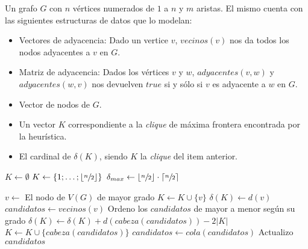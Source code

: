 \begin{pseudocodigo}
    \Require Un grafo $G$ con $n$ v\'ertices numerados de $1$ a $n$ y $m$ aristas. El mismo
        cuenta con las siguientes estructuras de datos que lo modelan:
        \begin{itemize}
            \item Vectores de adyacencia: Dado un vertice $v$, $vecinos(v)$ nos da todos los
                nodos adyacentes a $v$ en $G$.

            \item Matriz de adyacencia: Dados los v\'ertices $v$ y $w$, $adyacentes(v,w)$ y
                $adyacentes(w,v)$ nos devuelven $true$ si y s\'olo si $v$ es adyacente
                a $w$ en $G$.

            \item Vector de nodos de $G$.
        \end{itemize}
    \Ensure\Statex
        \begin{itemize}
            \item Un vector $K$ correspondiente a la \emph{clique} de m\'axima frontera
                encontrada por la heur\'istica.

            \item El cardinal de $\delta(K)$, siendo $K$ la \emph{clique} del item anterior.
        \end{itemize}
    \Statex

    \State $K \gets \emptyset$ 
     
        \State $K \gets \left\{1;\dots;\left\lfloor\sfrac{n}{2}\right\rfloor\right\}$ 
        \State $\delta_{max} \gets \left\lfloor\sfrac{n}{2}\right\rfloor\cdot
            \left\lceil\sfrac{n}{2}\right\rceil$ 
        \Statex

    \Else
        \State $v \gets$ El nodo de $V(G)$ de mayor grado 
        \State $K \gets K \cup \{v\}$ 
        \State $\delta(K) \gets d(v)$ 
        \State $candidatos \gets vecinos(v)$ 
        \State Ordeno los $candidatos$ de mayor a menor seg\'un su grado 
         
            \State $\delta(K) \gets \delta(K) + d(cabeza(candidatos)) - 2|K|$ 
            \State $K \gets K \cup \{cabeza(candidatos)\}$ 
            \State $candidatos \gets cola(candidatos)$ 
            \State Actualizo $candidatos$ 
        \EndWhile {}
    \EndIf {}

    \State {} 
    \Statex
    \Statex {}
\end{pseudocodigo}

